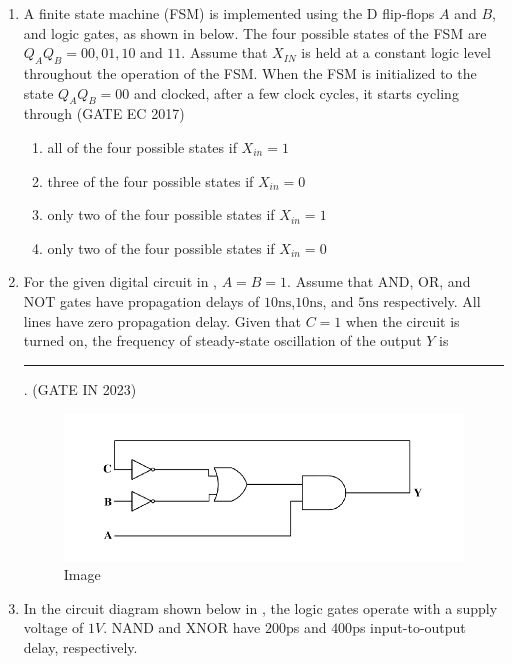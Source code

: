 \begin{enumerate}[label=\arabic*.,ref=\theenumi]
\begin{enumerate}
\end{enumerate}
\fi
%
\item A finite state machine (FSM) is implemented using the D flip-flops $A$ and $B$, and logic gates, as shown in  
	below. The four possible states of the FSM are $Q_AQ_B = 00, 01, 10$ and	 $11$.  
Assume that $X_{IN}$ is held at a constant logic level throughout the operation of the FSM. When the FSM is initialized to the state $Q_AQ_B = 00$ and clocked, after a few clock cycles, it starts cycling through
\hfill{(GATE EC 2017)}
\begin{enumerate}
\item all of the four possible states if $X_{in} = 1$
\item three of the four possible states if $X_{in} = 0$
\item only two of the four possible states if $X_{in} = 1$
\item only two of the four possible states if $X_{in} = 0$
\end{enumerate}
%
\begin{figure}[H]
\centering
\resizebox{0.75\columnwidth}{!}{%
	
}%
	\caption{}
\label{fig:ide/fsm/figs/circuit}
\end{figure}
\iffalse
\item For the given digital circuit
in	,
	 $A = B = 1$. Assume that AND, OR, and NOT gates have propagation delays of $10\mathrm{ns}$,$10\mathrm{ns}$, and $5\mathrm{ns}$ respectively. All lines have zero
propagation delay. Given that $C = 1$ when the circuit is turned on, the frequency of steady-state oscillation of the output $Y$  is  \rule{1cm}{0.5pt}.
\hfill (GATE IN 2023)
\begin{figure}[H]
        \centering  
        
        \includegraphics[width=0.75\columnwidth]{figs/gate.png}
        \caption{Image}
	\label{fig:Image}
\end{figure}
%
\item In the circuit diagram shown below
in , the logic gates operate with a supply voltage of $1 V$. NAND and XNOR have $200$ps and $400$ps input-to-output delay, respectively.


\end{enumerate}
